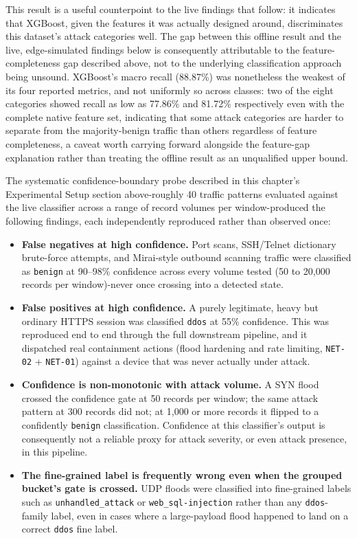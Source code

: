 This result is a useful counterpoint to the live findings that follow: it indicates that XGBoost, given the features it was actually designed around, discriminates this dataset's attack categories well. The gap between this offline result and the live, edge-simulated findings below is consequently attributable to the feature-completeness gap described above, not to the underlying classification approach being unsound. XGBoost's macro recall (88.87\%) was nonetheless the weakest of its four reported metrics, and not uniformly so across classes: two of the eight categories showed recall as low as 77.86\% and 81.72\% respectively even with the complete native feature set, indicating that some attack categories are harder to separate from the majority-benign traffic than others regardless of feature completeness, a caveat worth carrying forward alongside the feature-gap explanation rather than treating the offline result as an unqualified upper bound.

The systematic confidence-boundary probe described in this chapter's Experimental Setup section above-roughly 40 traffic patterns evaluated against the live classifier across a range of record volumes per window-produced the following findings, each independently reproduced rather than observed once:

\begin{itemize}
	\item \textbf{False negatives at high confidence.} Port scans, SSH/Telnet dictionary brute-force attempts, and Mirai-style outbound scanning traffic were classified as \texttt{benign} at 90--98\% confidence across every volume tested (50 to 20,000 records per window)-never once crossing into a detected state.
	\item \textbf{False positives at high confidence.} A purely legitimate, heavy but ordinary HTTPS session was classified \texttt{ddos} at 55\% confidence. This was reproduced end to end through the full downstream pipeline, and it dispatched real containment actions (flood hardening and rate limiting, \texttt{NET-02} + \texttt{NET-01}) against a device that was never actually under attack.
	\item \textbf{Confidence is non-monotonic with attack volume.} A SYN flood crossed the confidence gate at 50 records per window; the same attack pattern at 300 records did not; at 1,000 or more records it flipped to a confidently \texttt{benign} classification. Confidence at this classifier's output is consequently not a reliable proxy for attack severity, or even attack presence, in this pipeline.
	\item \textbf{The fine-grained label is frequently wrong even when the grouped bucket's gate is crossed.} UDP floods were classified into fine-grained labels such as \texttt{unhandled\_attack} or \texttt{web\_sql-injection} rather than any \texttt{ddos}-family label, even in cases where a large-payload flood happened to land on a correct \texttt{ddos} fine label.
\end{itemize}

